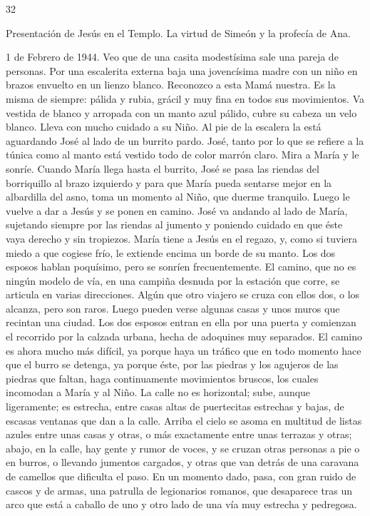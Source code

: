 \documentclass[12pt]{book} %
\begin{document}
 
32 
 
Presentación de Jesús en el Templo. La virtud de Simeón y la profecía de Ana. 
 
1 de Febrero de 1944. 
Veo que de una casita modestísima sale una pareja de personas. 
Por una escalerita externa baja una jovencísima madre con un niño en brazos envuelto en un lienzo blanco. 
Reconozco a esta Mamá nuestra. Es la misma de siempre: pálida y rubia, grácil y muy fina en todos sus movimientos. Va 
vestida de blanco y arropada con un manto azul pálido, cubre su cabeza un velo blanco. Lleva con mucho cuidado a su Niño. 
Al pie de la escalera la está aguardando José al lado de un burrito pardo. José, tanto por lo que se refiere a la túnica 
como al manto está vestido todo de color marrón claro. Mira a María y le sonríe. Cuando María llega hasta el burrito, José se pasa las riendas del borriquillo al brazo izquierdo y para que María pueda sentarse mejor en la albardilla del asno, toma un momento al Niño, que duerme tranquilo. Luego le vuelve a dar a Jesús y se ponen en camino. 
José va andando al lado de María, sujetando siempre por las riendas al jumento y poniendo cuidado en que éste vaya 
derecho y  sin tropiezos. María tiene a Jesús en el regazo, y, como si tuviera miedo a que cogiese frío, le extiende encima un borde de su manto. Los dos esposos hablan poquísimo, pero se sonríen frecuentemente. 
El camino, que no es ningún modelo de vía, en una campiña desnuda por la estación que corre, se articula en varias 
direcciones. Algún que otro viajero se cruza con ellos dos, o los alcanza, pero son raros.                             
Luego pueden verse algunas casas y unos muros que recintan una ciudad. Los dos esposos entran en ella por una puerta y comienzan el recorrido por la calzada urbana, hecha de adoquines muy separados. El camino es ahora mucho más difícil, ya porque haya un tráfico que en todo momento hace que el burro se detenga, ya porque éste, por las piedras y los agujeros de las piedras que faltan, haga continuamente movimientos bruscos, los cuales incomodan a María y al Niño. 
La calle no es horizontal; sube, aunque ligeramente; es estrecha, entre casas altas de puertecitas estrechas y bajas, de escasas ventanas que dan a la calle. Arriba el cielo se asoma en multitud de listas azules entre unas casas y otras, o más exactamente entre unas terrazas y otras; abajo, en la calle, hay gente y rumor de voces, y se cruzan otras personas a pie o en burros, o llevando jumentos cargados, y otras que van detrás de una caravana de camellos que dificulta el paso. En un momento dado, pasa, con gran ruido de cascos y de armas, una patrulla de legionarios romanos, que desaparece tras un arco que está a caballo de uno y otro lado de una vía muy estrecha y pedregosa. 
\end{document}
